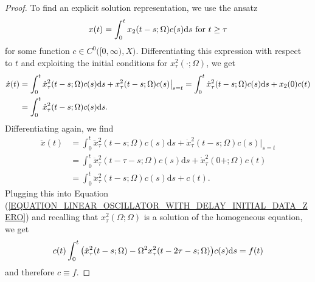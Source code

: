 \documentclass[12pt]{article}
\numberwithin{equation}{section}
\numberwithin{equation}{section}
\begin{document}
	\begin{proof}
		To find an explicit solution representation, we use the ansatz
		\begin{equation}
			x(t) = \int_{0}^{t} x_{2}(t - s; \Omega) c(s) \mathrm{d}s \text{ for } t \geq \tau \notag
		\end{equation}
		for some function $c \in C^{0}\big([0, \infty), X\big)$.
		Differentiating this expression with respect to $t$ and exploiting the initial conditions for $x^{2}_{\tau}(\cdot; \Omega)$, we get
		\begin{align*}
			\dot{x}(t) &= \int_{0}^{t} \dot{x}^{2}_{\tau}(t - s; \Omega) c(s) \mathrm{d}s + x^{2}_{\tau}(t - s; \Omega) c(s)\big|_{s = t}
			= \int_{0}^{t} \dot{x}^{2}_{\tau}(t - s; \Omega) c(s) \mathrm{d}s + x_{2}(0) c(t) \\
			&= \int_{0}^{t} \dot{x}^{2}_{\tau}(t - s; \Omega) c(s) \mathrm{d}s. \notag
		\end{align*}
		Differentiating again, we find
		\begin{align*}
			\ddot{x}(t) &= \int_{0}^{t} \ddot{x}^{2}_{\tau}(t - s; \Omega) c(s) \mathrm{d}s + \dot{x}^{2}_{\tau}(t - s; \Omega) c(s)\big|_{s = t} \\
			&= \int_{0}^{t} \ddot{x}^{2}_{\tau}(t - \tau - s; \Omega) c(s) \mathrm{d}s + \dot{x}^{2}_{\tau}(0+; \Omega) c(t) \\
			&= \int_{0}^{t} \ddot{x}^{2}_{\tau}(t - s; \Omega) c(s) \mathrm{d}s + c(t).
		\end{align*}
		Plugging this into Equation (\ref{EQUATION_LINEAR_OSCILLATOR_WITH_DELAY_INITIAL_DATA_ZERO})
		and recalling that $x^{2}_{\tau}(\Omega; \Omega)$ is a solution of the homogeneous equation, we get
		\begin{equation}
			c(t) \int_{0}^{t} \big(\ddot{x}^{2}_{\tau}(t - s; \Omega) - \Omega^{2} x^{2}_{\tau}(t - 2\tau - s; \Omega)\big) c(s) \mathrm{d}s = f(t) \notag
		\end{equation}
		and therefore $c \equiv f$.
	\end{proof}
\end{document}
